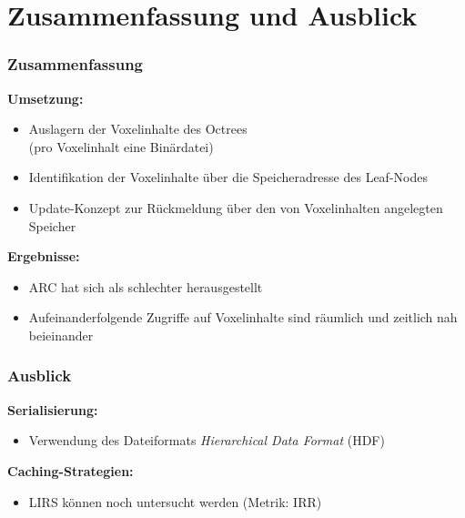 \documentclass[presentation]{beamer}
\newcommand{ 
\OutlineAtBeginSection}{
	\AtBeginSection[]
	{
		\begin{frame}{Überblick}
		\tableofcontents[currentsection]
		\end{frame}
	}
}
\begin{document}
\OutlineAtBeginSection
\section{Zusammenfassung und Ausblick}
\begin{frame}
	\frametitle{Zusammenfassung}
	\color{dd-gray} \textbf{Umsetzung:} \color{black} 
	\begin{itemize}
		\item Auslagern der Voxelinhalte des Octrees\\(pro Voxelinhalt eine Binärdatei)
		\item Identifikation der Voxelinhalte über die Speicheradresse des Leaf-Nodes
		\item Update-Konzept zur Rückmeldung über den von Voxelinhalten angelegten Speicher
		\baselineskip
	\end{itemize} 
	\color{dd-gray} \textbf{Ergebnisse:} \color{black} 
	\begin{itemize}
		\item ARC hat sich als schlechter herausgestellt
		\item Aufeinanderfolgende Zugriffe auf Voxelinhalte sind räumlich und zeitlich nah beieinander
	\end{itemize} 
\end{frame}
 
 
\begin{frame}
	\frametitle{Ausblick}
	\color{dd-gray} \textbf{Serialisierung:} \color{black} 
	\begin{itemize}
		\item Verwendung des Dateiformats \emph{Hierarchical Data Format} (HDF)
	\end{itemize} 
	\baselineskip
	\color{dd-gray} \textbf{Caching-Strategien:} \color{black} 
	\begin{itemize}
		\item LIRS können noch untersucht werden (Metrik: IRR) %
	\end{itemize}
\end{frame}

\nocite{podlipnig2003survey}
\nocite{karedla1994caching}
\nocite{cherkasova1998improving} 
\end{document}
